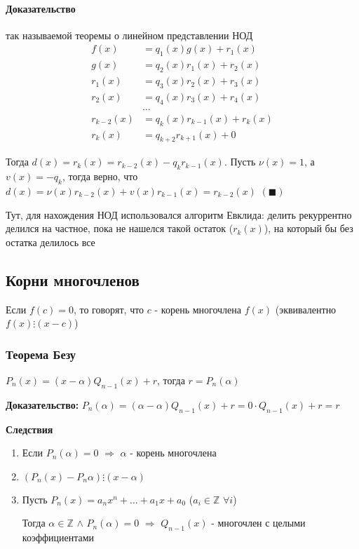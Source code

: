 \documentclass[class=article,a4paper,12pt,crop=false]{standalone}
\begin{document}
\paragraph{Доказательство} так называемой теоремы о линейном представлении НОД
\begin{equation}
    \begin{aligned}
        f(x) &= q_1(x)g(x) + r_1(x) \\
        g(x) &= q_2(x)r_1(x) + r_2(x) \\
        r_1(x) &= q_3(x)r_2(x) + r_3(x) \\
        r_2(x) &= q_4(x)r_3(x) + r_4(x) \\
        &\dots \\
        r_{k - 2}(x) &= q_k(x)r_{k - 1}(x) + r_k(x) \\
        r_k(x) &= q_{k + 2}r_{k + 1}(x) + 0
    \end{aligned}
\end{equation}

Тогда $d(x) = r_k(x) = r_{k - 2}(x) - q_kr_{k-1}(x)$. Пусть $\nu(x) = 1$, а $v(x) = -q_k$, тогда верно, что
$d(x) = \nu(x)r_{k - 2}(x) + v(x)r_{k - 1}(x) = r_{k - 2}(x)$ $(\blacksquare)$

Тут, для нахождения НОД использовался алгоритм Евклида: делить рекуррентно делился на частное,
пока не нашелся такой остаток ($r_k(x)$), на который бы без остатка делилось все

\subsection{Корни многочленов}

Если $f(c) = 0$, то говорят, что $c$ - корень многочлена $f(x)$ (эквивалентно $f(x) \vdots (x - c)$)

\subsubsection{Теорема Безу}

$P_n(x) = (x - \alpha)Q_{n - 1}(x) + r$, тогда $r = P_n(\alpha)$

\textbf{Доказательство:} $P_n(\alpha) = (\alpha - \alpha)Q_{n - 1}(x) + r = 0\cdot{Q_{n - 1}(x)} + r = r$

\textbf{Следствия}
\begin{enumerate}
    \item {
        Если $P_n(\alpha) = 0$ $\Rightarrow$ $\alpha$ - корень многочлена
    }
    \item {
        $(P_n(x) - P_n{\alpha})\vdots{(x - \alpha)}$
    }
    \item {
        Пусть $P_n(x) = a_nx^n + \dots + a_1x + a_0$ ($a_i \in \mathbb{Z}$ $\forall i$)

        Тогда $\alpha \in \mathbb{Z}$ $\land$ $P_n(\alpha) = 0$ $\Rightarrow$ $Q_{n - 1}(x)$ - многочлен с целыми коэффициентами
    }
\end{enumerate}
\end{document}
